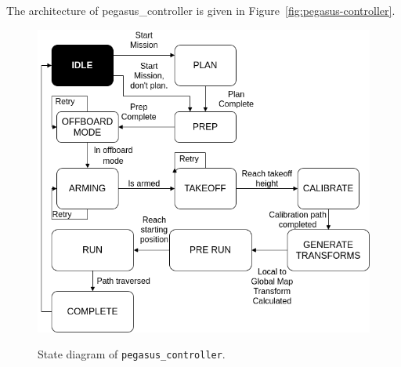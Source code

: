The architecture of pegasus\_controller is given in Figure~\ref{fig:pegasus-controller}.
\begin{figure}
	\centering
	\caption[State diagram of \texttt{pegasus\_controller}.]{\small State diagram of \texttt{pegasus\_controller}.}
	\includegraphics[width=5in]{figures/methodology/methodology-controller-state-diagram}
	\label{fig:controller-state-diagram}
\end{figure}

